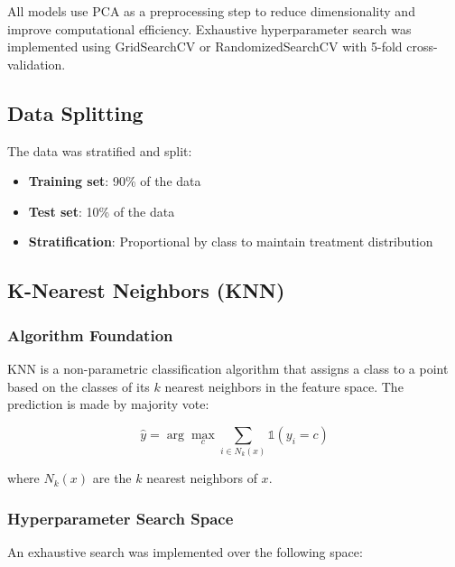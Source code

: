 \documentclass[12pt,a4paper]{article}
\begin{document}
All models use PCA as a preprocessing step to reduce dimensionality and improve computational efficiency. Exhaustive hyperparameter search was implemented using GridSearchCV or RandomizedSearchCV with 5-fold cross-validation.

\subsection{Data Splitting}

The data was stratified and split:
\begin{itemize}
    \item \textbf{Training set}: 90\% of the data
    \item \textbf{Test set}: 10\% of the data
    \item \textbf{Stratification}: Proportional by class to maintain treatment distribution
\end{itemize}

\subsection{K-Nearest Neighbors (KNN)}

\subsubsection{Algorithm Foundation}

KNN is a non-parametric classification algorithm that assigns a class to a point based on the classes of its $k$ nearest neighbors in the feature space. The prediction is made by majority vote:

\begin{equation}
\hat{y} = \arg\max_{c} \sum_{i \in N_k(x)} \mathbb{1}(y_i = c)
\end{equation}

where $N_k(x)$ are the $k$ nearest neighbors of $x$.

\subsubsection{Hyperparameter Search Space}

An exhaustive search was implemented over the following space:
\end{document}
